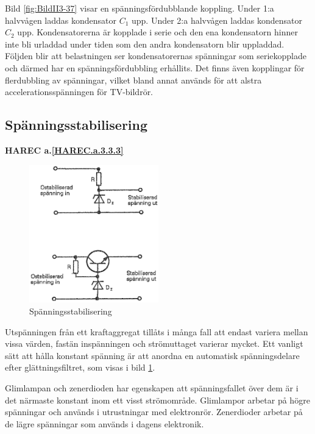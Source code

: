 Bild \ref{fig:BildII3-37} visar en spänningsfördubblande koppling.
Under 1:a halvvågen laddas kondensator \(C_1\) upp.
Under 2:a halvvågen laddas kondensator \(C_2\) upp.
Kondensatorerna är kopplade i serie och den ena kondensatorn hinner inte bli
urladdad under tiden som den andra kondensatorn blir uppladdad.
Följden blir att belastningen ser kondensatorernas spänningar som seriekopplade
och därmed har en spänningsfördubbling erhållits.
Det finns även kopplingar för flerdubbling av spänningar, vilket bland annat
används för att alstra accelerationsspänningen för TV-bildrör.

\subsection{Spänningsstabilisering}
\textbf{HAREC a.\ref{HAREC.a.3.3.3}\label{myHAREC.a.3.3.3}}

\begin{figure}
\includegraphics[width=0.5\textwidth]{images/cropped_pdfs/bild_2_3-38.pdf}
\caption{Spänningsstabilisering}
\label{fig:BildII3-38}
\end{figure}

Utspänningen från ett kraftaggregat tillåts i många fall att endast variera
mellan vissa värden, fastän inspänningen och strömuttaget varierar mycket.
Ett vanligt sätt att hålla konstant spänning är att anordna en automatisk
spänningsdelare efter glättningsfiltret, som visas i bild \ref{fig:BildII3-38}.

Glimlampan och zenerdioden har egenskapen att spänningsfallet över dem är i det
närmaste konstant inom ett visst strömområde.
Glimlampor arbetar på högre spänningar och används i utrustningar med
elektronrör.
Zenerdioder arbetar på de lägre spänningar som används i dagens elektronik.

